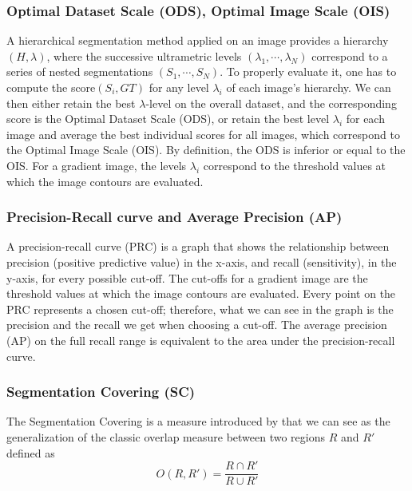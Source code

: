\documentclass[journal]{IEEEtran}
\begin{document}
\subsubsection{Optimal Dataset Scale (ODS), Optimal Image Scale (OIS)}

A hierarchical segmentation method applied on an image provides a hierarchy $(H, \lambda)$, where the successive ultrametric levels $(\lambda_1, \cdots , \lambda_N )$ correspond to a series of nested segmentations $(S_1, \cdots , S_N )$. To properly evaluate it, one has to compute the score$(S_i , GT )$ for any level $\lambda_i$ of each image's hierarchy. We can then either retain the best $\lambda$-level on the overall dataset, and the corresponding score is the Optimal Dataset Scale (ODS), or retain the best level $\lambda_i$ for each image and average the best individual scores for all images, which correspond to the Optimal Image Scale (OIS). By definition, the ODS is inferior or equal to the OIS. For a gradient image, the levels $\lambda_i$ correspond to the threshold values at which the image contours are evaluated.

\subsubsection{Precision-Recall curve and Average Precision (AP)}

A precision-recall curve (PRC) is a graph that shows the relationship between precision (positive predictive value) in the x-axis, and recall (sensitivity), in the y-axis, for every possible cut-off. The cut-offs for a gradient image are the threshold values at which the image contours are evaluated. Every point on the PRC represents a chosen cut-off; therefore, what we can see in the graph is the precision and the recall we get when choosing a cut-off. The average precision (AP) on the full recall range is equivalent to the area under the precision-recall curve.

\subsubsection{Segmentation Covering (SC)}

The Segmentation Covering is a measure introduced by \cite{Arbelaez.Maire.ea:PR:2009} that we can see as the generalization of the classic overlap measure between two regions $R$ and $R'$ defined as
\begin{equation}
	O(R, R') = \frac{R \cap R'}{R \cup R'}
\end{equation}
\end{document}
